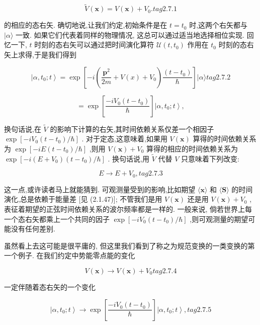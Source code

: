 \documentclass[lang=cn,newtx,10pt,scheme=chinese,thmcnt=section]{elegantbook}
\begin{document}
$$
\widetilde{V}\left( \mathbf{x}\right) = V\left( \mathbf{x}\right) + {V}_{0}. tag{2.7.1}
$$

的相应的态右矢. 确切地说,让我们约定,初始条件是在 $t = {t}_{0}$ 时,这两个右矢都与 $|\alpha \rangle$ 一致. 如果它们代表着同样的物理情况, 这总可以通过适当地选择相位实现. 回忆一下, $t$ 时刻的态右矢可以通过把时间演化算符 $\mathcal{U}\left( {t,{t}_{0}}\right)$ 作用在 ${t}_{0}$ 时刻的态右矢上求得,于是我们得到

$$
\left| {\alpha ,{t}_{0};t}\right\rangle = \exp \left\lbrack {-i\left( {\frac{{\mathbf{p}}^{2}}{2m} + V\left( x\right) + {V}_{0}}\right) \frac{\left( t - {t}_{0}\right) }{\hbar }}\right\rbrack |\alpha \rangle tag{2.7.2}
$$

$$
= \exp \left\lbrack \frac{-i{V}_{0}\left( {t - {t}_{0}}\right) }{\hbar }\right\rbrack \left| {\alpha ,{t}_{0};t}\right\rangle ,
$$

换句话说,在 $\widetilde{V}$ 的影响下计算的右矢,其时间依赖关系仅差一个相因子 $\exp \left\lbrack {-i{V}_{0}\left( {t - {t}_{0}}\right) /\hbar }\right\rbrack$ . 对于定态,这意味着,如果用 $V\left( \mathbf{x}\right)$ 算得的时间依赖关系为 $\exp \left\lbrack {-{iE}\left( {t - {t}_{0}}\right) /\hbar }\right\rbrack$ ,则用 $V\left( \mathbf{x}\right) + {V}_{0}$ 算得的相应的时间依赖关系为 $\exp \left\lbrack {-i\left( {E + {V}_{0}}\right) \left( {t - {t}_{0}}\right) /\hbar }\right\rbrack$ . 换句话说,用 $\widetilde{V}$ 代替 $V$ 只意味着下列改变:

$$
E \rightarrow E + {V}_{0}, tag{2. 7.3}
$$

这一点,或许读者马上就能猜到. 可观测量受到的影响,比如期望 $\langle \mathbf{x}\rangle$ 和 $\langle \mathbf{S}\rangle$ 的时间演化,总是依赖于能量差 [见 (2.1.47)]; 不管我们是用 $V\left( \mathbf{x}\right)$ 还是用 $V\left( \mathbf{x}\right) + {V}_{0}$ ,表征着期望的正弦时间依赖关系的波尔频率都是一样的. 一般来说, 倘若世界上每一个态右矢都乘上一个共同的因子 $\exp \left\lbrack {-i{V}_{0}\left( {t - {t}_{0}}\right) /\hbar }\right\rbrack$ ,则可观测量的期望可能没有任何差别.

虽然看上去这可能是很平庸的, 但这里我们看到了称之为规范变换的一类变换的第一个例子. 在我们约定中势能零点能的变化

$$
V\left( \mathbf{x}\right) \rightarrow V\left( \mathbf{x}\right) + {V}_{0} tag{2. 7.4}
$$

一定伴随着态右矢的一个变化

$$
\left| {\alpha ,{t}_{0};t}\right\rangle \rightarrow \exp \left\lbrack \frac{-i{V}_{0}\left( {t - {t}_{0}}\right) }{\hbar }\right\rbrack \left| {\alpha ,{t}_{0};t}\right\rangle , tag{2.7.5}
$$
\end{document}
